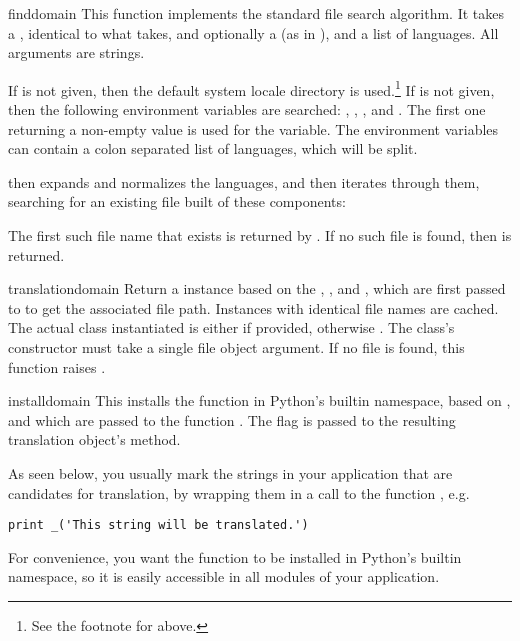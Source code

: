 \begin{funcdesc}{find}{domain}
This function implements the standard  file search
algorithm.  It takes a , identical to what
 takes, and optionally a  (as in
), and a list of languages.  All arguments
are strings.

If  is not given, then the default system locale
directory is used.\footnote{See the footnote for
 above.}  If  is not given,
then the following environment variables are searched: ,
, , and .  The first one
returning a non-empty value is used for the  variable.
The environment variables can contain a colon separated list of
languages, which will be split.

 then expands and normalizes the languages, and then
iterates through them, searching for an existing file built of these
components:


The first such file name that exists is returned by .
If no such file is found, then  is returned.
\end{funcdesc}

\begin{funcdesc}{translation}{domain}
Return a  instance based on the ,
, and , which are first passed to
 to get the
associated  file path.  Instances with
identical  file names are cached.  The actual class instantiated
is either  if provided, otherwise
.  The class's constructor must take a single
file object argument.  If no  file is found, this
function raises .
\end{funcdesc}

\begin{funcdesc}{install}{domain}
This installs the function \function{_} in Python's builtin namespace,
based on , and  which are passed to the
function .  The  flag is passed to
the resulting translation object's  method.

As seen below, you usually mark the strings in your application that are
candidates for translation, by wrapping them in a call to the function
\function{_()}, e.g.

\begin{verbatim}
print _('This string will be translated.')
\end{verbatim}

For convenience, you want the \function{_()} function to be installed in
Python's builtin namespace, so it is easily accessible in all modules
of your application.  
\end{funcdesc}


